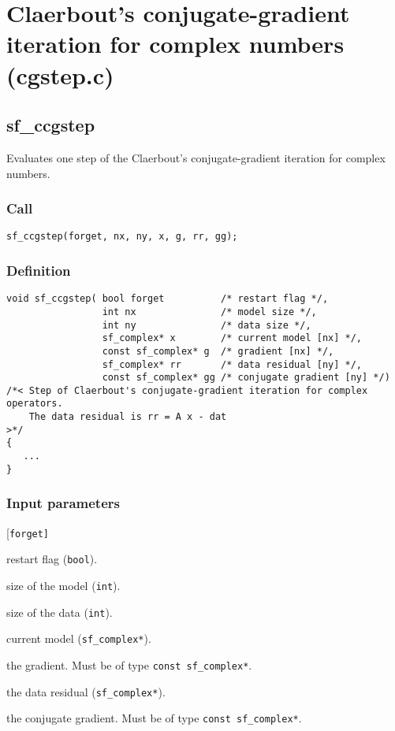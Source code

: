 \section[CG iteration (complex data) (cgstep.c)]{Claerbout's conjugate-gradient iteration for complex numbers (cgstep.c)}




\subsection{{sf\_ccgstep}}\label{sec:sf_ccgstep}
Evaluates one step of the Claerbout's conjugate-gradient iteration for complex numbers.

\subsubsection*{Call}
\begin{verbatim}sf_ccgstep(forget, nx, ny, x, g, rr, gg);\end{verbatim}

\subsubsection*{Definition}
\begin{verbatim}
void sf_ccgstep( bool forget          /* restart flag */, 
                 int nx               /* model size */, 
                 int ny               /* data size */, 
                 sf_complex* x        /* current model [nx] */,  
                 const sf_complex* g  /* gradient [nx] */, 
                 sf_complex* rr       /* data residual [ny] */,
                 const sf_complex* gg /* conjugate gradient [ny] */) 
/*< Step of Claerbout's conjugate-gradient iteration for complex operators. 
    The data residual is rr = A x - dat
>*/
{
   ...
}
\end{verbatim}

\subsubsection*{Input parameters}
\begin{desclist}{\tt }{\quad}[\tt forget]
   \setlength\itemsep{0pt}
   \item[forget] restart flag (\texttt{bool}).  
   \item[nx]     size of the model (\texttt{int}).  
   \item[ny]     size of the data (\texttt{int}).  
   \item[x]      current model (\texttt{sf\_complex*}).  
   \item[g]      the gradient. Must be of type \texttt{const sf\_complex*}.  
   \item[rr]     the data residual (\texttt{sf\_complex*}).  
   \item[gg]     the conjugate gradient. Must be of type \texttt{const sf\_complex*}.  
\end{desclist}




